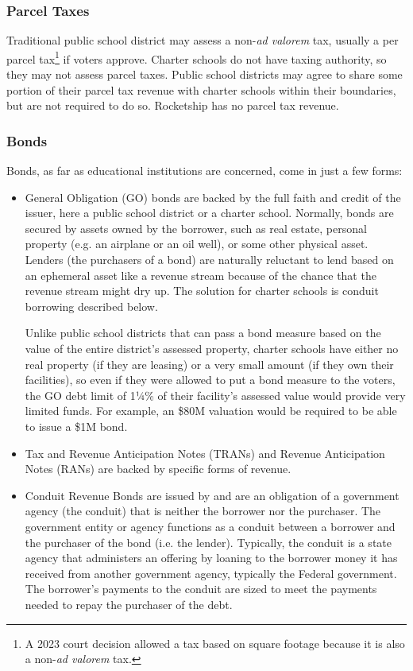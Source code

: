 \subsubsection{Parcel Taxes}
\label{sec:parcel-taxes}\indent%

Traditional public school district may assess a non-\textit{ad valorem} tax, usually a per parcel tax\footnote{A 2023 court decision allowed a tax based on square footage because it is also a non-\textit{ad valorem} tax.} if voters approve. Charter schools do not have taxing authority, so they may not assess parcel taxes. Public school districts may agree to share some portion of their parcel tax revenue with charter schools within their boundaries, but are not required to do so. Rocketship has no parcel tax revenue.

\subsubsection{Bonds}
\label{sec:bonds}\indent%

Bonds, as far as educational institutions are concerned, come in just a few forms:

\begin{itemize}
  \item General Obligation (GO) bonds are backed by the full faith and credit of the issuer, here a public school district or a charter school. Normally, bonds are secured by assets owned by the borrower, such as real estate, personal property (e.g. an airplane or an oil well), or some other physical asset. Lenders (the purchasers of a bond) are naturally reluctant to lend based on an ephemeral asset like a revenue stream because of the chance that the revenue stream might dry up. The solution for charter schools is conduit borrowing described below.

  Unlike public school districts that can pass a bond measure based on the value of the entire district's assessed property, charter schools have either no real property (if they are leasing) or a very small amount (if they own their facilities), so even if they were allowed to put a bond measure to the voters, the GO debt limit of 1¼\% of their facility's assessed value would provide very limited funds. For example, an \$80M valuation would be required to be able to issue a \$1M bond. 

  \item Tax and Revenue Anticipation Notes (TRANs) and Revenue Anticipation Notes (RANs) are backed by specific forms of revenue. 
  \item Conduit Revenue Bonds are issued by and are an obligation of a government agency (the conduit) that is neither the borrower nor the purchaser. The government entity or agency functions as a conduit between a borrower and the purchaser of the bond (i.e. the lender). Typically, the conduit is a state agency that administers an offering by loaning to the borrower money it has received from another government agency, typically the Federal government. The borrower's payments to the conduit are sized to meet the payments needed to repay the purchaser of the debt.
\end{itemize}

